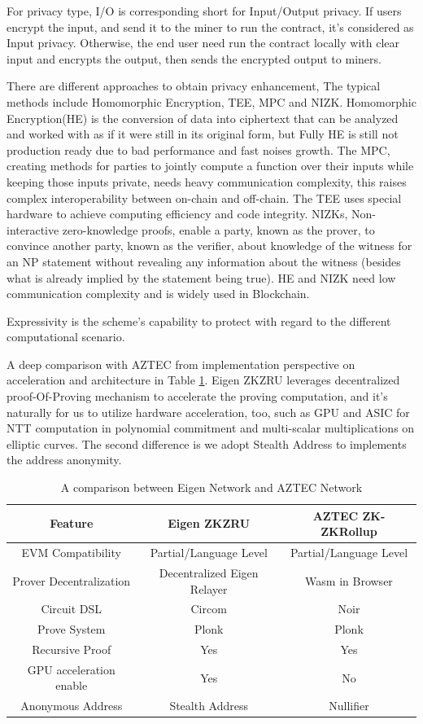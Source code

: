 \documentclass{article}
\begin{document}
For privacy type, I/O is corresponding short for Input/Output privacy. If users encrypt the input, and send it to the miner to run the contract, it's considered as Input privacy. Otherwise, the end user need run the contract locally with clear input and encrypts the output, then sends the encrypted output to miners.

There are different approaches to obtain privacy enhancement, The typical methods include Homomorphic Encryption, TEE, MPC and NIZK. Homomorphic Encryption(HE) is the conversion of data into ciphertext that can be analyzed and worked with as if it were still in its original form, but Fully HE is still not production ready due to bad performance and fast noises growth. The MPC, creating methods for parties to jointly compute a function over their inputs while keeping those inputs private, needs heavy communication complexity, this raises complex interoperability between on-chain and off-chain. The TEE uses special hardware to achieve computing efficiency and code integrity. NIZKs, Non-interactive zero-knowledge proofs, enable a party, known as the prover, to convince another party, known as the verifier, about knowledge of the witness for an NP statement without revealing any information about the witness (besides what is already implied by the statement being true). HE and NIZK need low communication complexity and is widely used in Blockchain. 

Expressivity is the scheme's capability to protect with regard to the different computational scenario.

A deep comparison with AZTEC from implementation perspective on acceleration and architecture in Table \ref{tab:widgets2}. Eigen ZKZRU leverages decentralized proof-Of-Proving mechanism to accelerate the proving computation, and it's naturally for us to utilize hardware acceleration, too, such as GPU and ASIC for NTT computation in polynomial commitment and multi-scalar multiplications on elliptic curves. The second difference is we adopt Stealth Address to implements the address anonymity.

\begin{table}
\centering
\begin{tabular}{c|c|c}
Feature & Eigen ZKZRU & AZTEC ZK-ZKRollup \\\hline
EVM Compatibility & Partial/Language Level & Partial/Language Level \\

Prover Decentralization & \color{red} Decentralized Eigen Relayer & Wasm in Browser \\
Circuit DSL & Circom & Noir \\
Prove System & Plonk & Plonk \\
Recursive Proof & Yes & Yes \\
GPU acceleration enable & \color{red} Yes & No \\
Anonymous Address & Stealth Address & Nullifier \\

\end{tabular}
\caption{\label{tab:widgets2} A comparison between Eigen Network and AZTEC Network}
\end{table}
\end{document}
